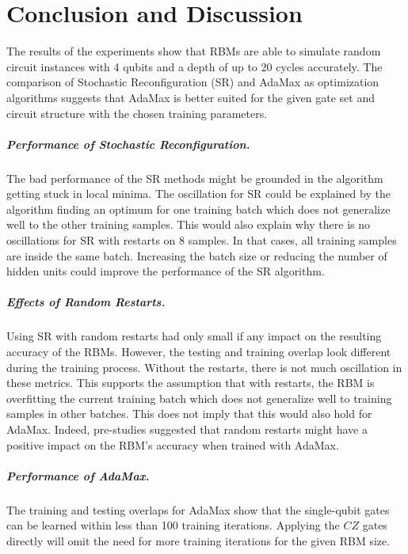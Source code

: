 \chapter{Conclusion and Discussion}

The results of the experiments show that RBMs are able to simulate random circuit 
instances with 4 qubits and a depth of up to 20 cycles accurately. The comparison of 
Stochastic Reconfiguration (SR) and AdaMax as optimization algorithms suggests that 
AdaMax is better suited for the given gate set and circuit structure with the chosen training 
parameters. 

\paragraph{Performance of Stochastic Reconfiguration.}
The bad performance of the SR methods might be grounded in the algorithm getting stuck in 
local minima. The oscillation for SR could be explained by the algorithm finding an 
optimum for one training batch which does not generalize well to the other training samples.
This would also explain why there is no oscillations for SR with restarts on 8 samples. In that
cases, all training samples are inside the same batch. Increasing the batch size or reducing the 
number of hidden units could improve the performance of the SR algorithm.

\paragraph{Effects of Random Restarts.}
Using SR with random restarts had only small if any 
impact on the resulting accuracy of the RBMs. However, the testing and training overlap 
look different during the training process. Without the restarts, there is not much 
oscillation in these metrics. This supports the assumption that with restarts, the 
RBM is overfitting the current training batch which does not generalize well to training 
samples in other batches. This does not imply that this would also 
hold for AdaMax. Indeed, pre-studies suggested that random restarts might have a positive 
impact on the RBM's accuracy when trained with AdaMax.

\paragraph{Performance of AdaMax.}
The training and testing overlaps for AdaMax show that the single-qubit gates can 
be learned within less than 100 training iterations. Applying 
the $CZ$ gates directly will omit the need for more training iterations for the given RBM size.

